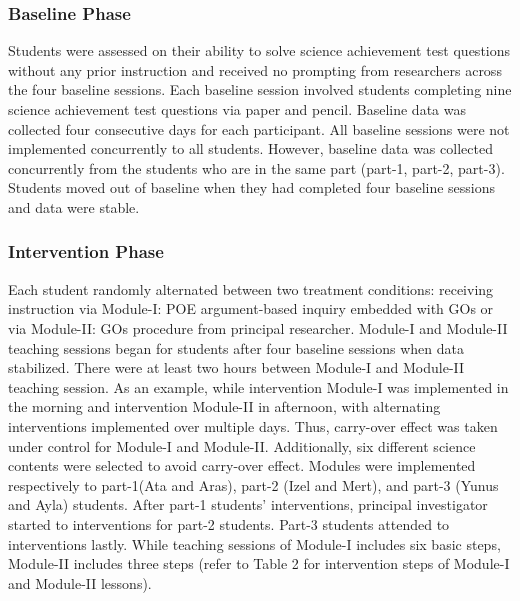 \documentclass[11.5pt]{sig-alternate} %
\begin{document}
\begin{large}
\subsubsection*{Baseline Phase}
Students were assessed on their ability to solve science achievement test questions without any prior instruction and received no prompting from researchers across the four baseline sessions. Each baseline session involved students completing nine science achievement test questions via paper and pencil. Baseline data was collected four consecutive days for each participant. All baseline sessions were not implemented concurrently to all students. However, baseline data was collected concurrently from the students who are in the same part (part-1, part-2, part-3).  Students moved out of baseline when they had completed four baseline sessions and data were stable.

\subsubsection*{Intervention Phase}
Each student randomly alternated between two treatment conditions: receiving instruction via Module-I: POE argument-based inquiry embedded with GOs or via Module-II: GOs procedure from principal researcher. Module-I and Module-II teaching sessions began for students after four baseline sessions when data stabilized. There were at least two hours between Module-I and Module-II teaching session. As an example, while intervention Module-I was implemented in the morning and intervention Module-II in afternoon, with alternating interventions implemented over multiple days. Thus, carry-over effect was taken under control for Module-I and Module-II. Additionally, six different science contents were selected to avoid carry-over effect.  Modules were implemented respectively to part-1(Ata and Aras), part-2 (Izel and Mert), and part-3 (Yunus and Ayla) students. After part-1 students’ interventions, principal investigator started to interventions for part-2 students. Part-3 students attended to interventions lastly. While teaching sessions of Module-I includes six basic steps, Module-II includes three steps (refer to Table 2 for intervention steps of Module-I and Module-II lessons).


\end{large}
\end{document}
